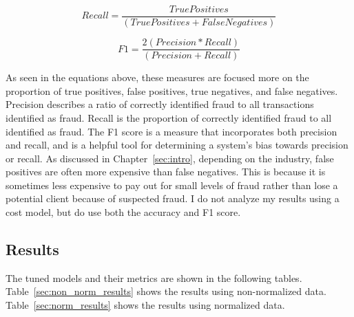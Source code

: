 \documentclass[midd]{thesis}
\begin{document}
\begin{equation}
\label{eq:recall}
    Recall = \frac{True Positives}{ (True Positives + False Negatives)}
\end{equation}

\begin{equation}
\label{eq:F1}
    F1 = \frac{2 (Precision * Recall)} {(Precision + Recall)}
\end{equation}


As seen in the equations above, these measures are focused more on the proportion of true positives, false positives, true negatives, and false negatives. Precision describes a ratio of correctly identified fraud to all transactions identified as fraud. Recall is the proportion of correctly identified fraud to all identified as fraud. The F1 score is a measure that incorporates both precision and recall, and is a helpful tool for determining a system's bias towards precision or recall. As discussed in Chapter~\ref{sec:intro}, depending on the industry, false positives are often more expensive than false negatives. This is because it is sometimes less expensive to pay out for small levels of fraud rather than lose a potential client because of suspected fraud. I do not analyze my results using a cost model, but do use both the accuracy and F1 score.


\subsection{Results}

The tuned models and their metrics are shown in the following tables. Table~\ref{sec:non_norm_results} shows the results using non-normalized data. Table~\ref{sec:norm_results} shows the results using normalized data. 
\end{document}
